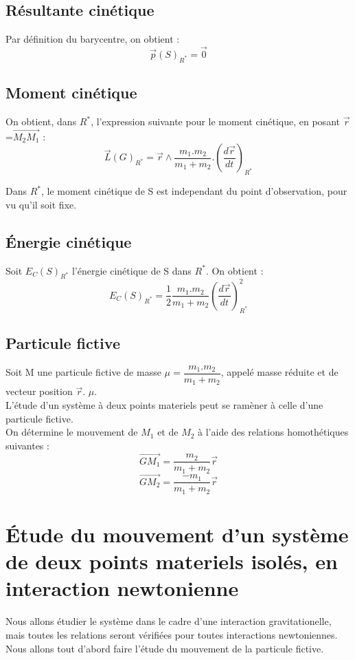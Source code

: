 \subsection{Résultante cinétique}
Par définition du barycentre, on obtient :
$$\overrightarrow{p}(S)_{R^*} = \overrightarrow{0}$$
\subsection{Moment cinétique}
On obtient, dans $R^*$, l'expression suivante pour le moment cinétique, en posant $\overrightarrow{r}$=$\overrightarrow{M_2M_1}$ :
$$\overrightarrow{L}(G)_{R^*} = \overrightarrow{r}\wedge\dfrac{m_1.m_2}{m_1+m_2}.\left( \dfrac{d\overrightarrow{r}}{dt}\right)_{R^*} $$
\begin{prop}
Dans $R^*$, le moment cinétique de S est independant du point d'observation, pour vu qu'il soit fixe.
\end{prop}
\subsection{Énergie cinétique}
Soit $E_C(S)_{R^*}$ l'énergie cinétique de S dans $R^*$. On obtient : 
$$E_C(S)_{R^*} = \dfrac{1}{2}\dfrac{m_1.m_2}{m_1+m_2}\left( \dfrac{d\overrightarrow{r}}{dt}\right)_{R^*} ^2$$
\subsection{Particule fictive}
Soit M une particule fictive de masse $\mu = \dfrac{m_1.m_2}{m_1+m_2}$, appelé masse réduite et de vecteur position $\overrightarrow{r}$. $\mu$.\\
L'étude d'un système à deux points materiels peut se ramèner à celle d'une particule fictive.\\
On détermine le mouvement de $M_1$ et de $M_2$ à l'aide des relations homothétiques suivantes : 
$$\overrightarrow{GM_1} = \dfrac{m_2}{m_1+m_2}\overrightarrow{r}$$
$$\overrightarrow{GM_2} = \dfrac{-m_1}{m_1+m_2}\overrightarrow{r}$$
\section{Étude du mouvement d'un système de deux points materiels isolés, en interaction newtonienne}
Nous allons étudier le système dans le cadre d'une interaction gravitationelle, mais toutes les relations seront vérifiées pour toutes interactions newtoniennes.\\
Nous allons tout d'abord faire l'étude du mouvement de la particule fictive.
